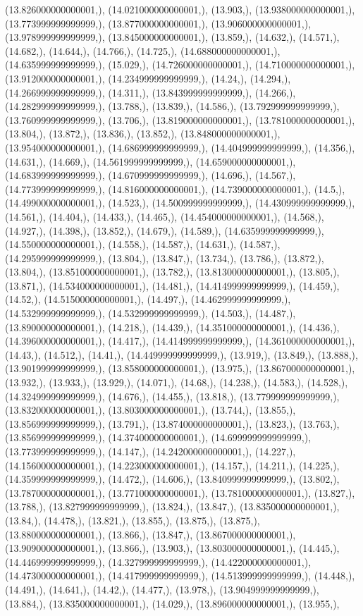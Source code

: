 \documentclass{article}
\begin{document}
(13.826000000000001,), (14.021000000000001,), (13.903,), (13.938000000000001,), (13.773999999999999,), (13.877000000000001,), (13.906000000000001,), (13.978999999999999,), (13.845000000000001,), (13.859,), (14.632,), (14.571,), (14.682,), (14.644,), (14.766,), (14.725,), (14.688000000000001,), (14.635999999999999,), (15.029,), (14.726000000000001,), (14.710000000000001,), (13.912000000000001,), (14.234999999999999,), (14.24,), (14.294,), (14.266999999999999,), (14.311,), (13.843999999999999,), (14.266,), (14.282999999999999,), (13.788,), (13.839,), (14.586,), (13.792999999999999,), (13.760999999999999,), (13.706,), (13.819000000000001,), (13.781000000000001,), (13.804,), (13.872,), (13.836,), (13.852,), (13.848000000000001,), (13.954000000000001,), (14.686999999999999,), (14.404999999999999,), (14.356,), (14.631,), (14.669,), (14.561999999999999,), (14.659000000000001,), (14.683999999999999,), (14.670999999999999,), (14.696,), (14.567,), (14.773999999999999,), (14.816000000000001,), (14.739000000000001,), (14.5,), (14.499000000000001,), (14.523,), (14.500999999999999,), (14.430999999999999,), (14.561,), (14.404,), (14.433,), (14.465,), (14.454000000000001,), (14.568,), (14.927,), (14.398,), (13.852,), (14.679,), (14.589,), (14.635999999999999,), (14.550000000000001,), (14.558,), (14.587,), (14.631,), (14.587,), (14.295999999999999,), (13.804,), (13.847,), (13.734,), (13.786,), (13.872,), (13.804,), (13.851000000000001,), (13.782,), (13.813000000000001,), (13.805,), (13.871,), (14.534000000000001,), (14.481,), (14.414999999999999,), (14.459,), (14.52,), (14.515000000000001,), (14.497,), (14.462999999999999,), (14.532999999999999,), (14.532999999999999,), (14.503,), (14.487,), (13.890000000000001,), (14.218,), (14.439,), (14.351000000000001,), (14.436,), (14.396000000000001,), (14.417,), (14.414999999999999,), (14.361000000000001,), (14.43,), (14.512,), (14.41,), (14.449999999999999,), (13.919,), (13.849,), (13.888,), (13.901999999999999,), (13.858000000000001,), (13.975,), (13.867000000000001,), (13.932,), (13.933,), (13.929,), (14.071,), (14.68,), (14.238,), (14.583,), (14.528,), (14.324999999999999,), (14.676,), (14.455,), (13.818,), (13.779999999999999,), (13.832000000000001,), (13.803000000000001,), (13.744,), (13.855,), (13.856999999999999,), (13.791,), (13.874000000000001,), (13.823,), (13.763,), (13.856999999999999,), (14.374000000000001,), (14.699999999999999,), (13.773999999999999,), (14.147,), (14.242000000000001,), (14.227,), (14.156000000000001,), (14.223000000000001,), (14.157,), (14.211,), (14.225,), (14.359999999999999,), (14.472,), (14.606,), (13.840999999999999,), (13.802,), (13.787000000000001,), (13.771000000000001,), (13.781000000000001,), (13.827,), (13.788,), (13.827999999999999,), (13.824,), (13.847,), (13.835000000000001,), (13.84,), (14.478,), (13.821,), (13.855,), (13.875,), (13.875,), (13.880000000000001,), (13.866,), (13.847,), (13.867000000000001,), (13.909000000000001,), (13.866,), (13.903,), (13.803000000000001,), (14.445,), (14.446999999999999,), (14.327999999999999,), (14.422000000000001,), (14.473000000000001,), (14.417999999999999,), (14.513999999999999,), (14.448,), (14.491,), (14.641,), (14.42,), (14.477,), (13.978,), (13.904999999999999,), (13.884,), (13.835000000000001,), (14.029,), (13.896000000000001,), (13.955,), 
\end{document}
